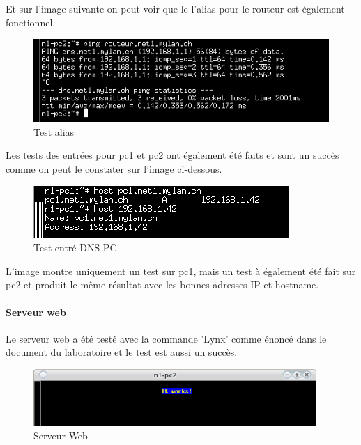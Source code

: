 \documentclass{article}
\begin{document}
Et sur l'image suivante on peut voir que le l'alias pour le routeur est également fonctionnel.

\begin{figure}[!h]
	\centering
	\includegraphics{./captures/alias-routeur.png}
	\caption{Test alias}
	\label{fig:Test alias}
\end{figure}

Les tests des entrées pour pc1 et pc2 ont également été faits et sont un succès comme on peut le constater sur l'image ci-dessous.

\begin{figure}[!h]
	\centering
	\includegraphics{./captures/2-test-dns-pc1.png}
	\caption{Test entré DNS PC}
	\label{fig:Test entrées DNS pc}
\end{figure}

L'image montre uniquement un test sur pc1, mais un test à également été fait sur pc2 et produit le même résultat avec les bonnes adresses IP et hostname.

\paragraph{Serveur web}

Le serveur web a été testé avec la commande 'Lynx' comme énoncé dans le document du laboratoire et le test est aussi un succès. \cite{doc-labo}

\begin{figure}[!h]
	\centering
	\includegraphics{./captures/ItWorks-www.png}
	\caption{Serveur Web}
	\label{fig:Serveur Web}
\end{figure}
\end{document}
